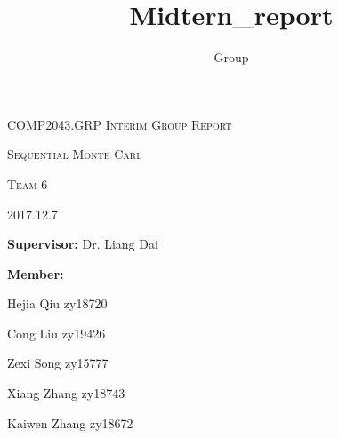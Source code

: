 \documentclass[11pt,oneside,a4paper]{article}
\author{Group}
\title{Midtern_report}
\begin{document}
\begin{titlepage}
\begin{center}
{\large \textsc{COMP2043.GRP Interim Group Report}}

\vspace{0.025\textheight} %
	{\huge \textsc{Sequential Monte Carl}} %

\vspace{0.045\textheight}
{\huge\textsc{Team 6}}
\vspace{0.05\textheight}

{\huge\textsc{ 2017.12.7}}
\vspace{0.45\textheight}


\textbf{Supervisor:} Dr. Liang Dai
\vspace{0.045\textheight}

\textbf{Member:}

\begin{spacing}{2.0}%
        Hejia Qiu zy18720

        Cong Liu zy19426

        Zexi Song zy15777

        Xiang Zhang zy18743

        Kaiwen Zhang zy18672
\end{spacing}
	\vspace{0.025\textheight}
\end{center}
\end{titlepage}
\tableofcontents
\newpage
\end{document}

